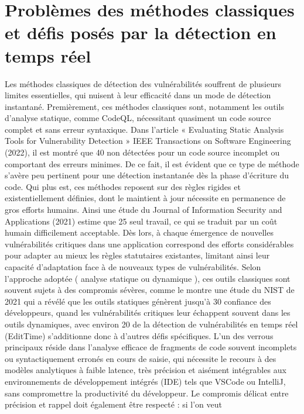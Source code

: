 \chapter{Problèmes des méthodes classiques et défis posés par la détection en temps réel}
    Les méthodes classiques de détection des vulnérabilités souffrent de plusieurs limites
essentielles, qui nuisent à leur efficacité dans un mode de détection instantané.
Premièrement, ces méthodes classiques sont, notamment les outils d’analyse statique,
comme CodeQL, nécessitant quasiment un code source complet et sans erreur syntaxique.
Dans l’article « Evaluating Static Analysis Tools for Vulnerability Detection » IEEE
Transactions on Software Engineering (2022), il est montré que 40%
non détectées pour un code source incomplet ou comportant des erreurs minimes. De ce
fait, il est évident que ce type de méthode s’avère peu pertinent pour une détection
instantanée dès la phase d’écriture du code. Qui plus est, ces méthodes reposent sur des
règles rigides et existentiellement définies, dont le maintient à jour nécessite en permanence
de gros efforts humains. Ainsi une étude du Journal of Information Security and Applications
(2021) estime que 25 %
seul travail, ce qui se traduit par un coût humain difficilement acceptable. Dès lors, à chaque
émergence de nouvelles vulnérabilités critiques dans une application correspond des efforts
considérables pour adapter au mieux les règles statutaires existantes, limitant ainsi leur
capacité d’adaptation face à de nouveaux types de vulnérabilités.
Selon l’approche adoptée ( analyse statique ou dynamique ), ces outils classiques sont
souvent sujets à des compromis sévères, comme le montre une étude du NIST de 2021 qui
a révélé que les outils statiques génèrent jusqu’à 30 %
confiance des développeurs, quand les vulnérabilités critiques leur échappent souvent dans
les outils dynamiques, avec environ 20 %
de la détection de vulnérabilités en temps réel (EditTime) s’additionne donc à d’autres défis
spécifiques. L’un des verrous principaux réside dans l’analyse efficace de fragments de code
souvent incomplets ou syntactiquement erronés en cours de saisie, qui nécessite le recours
à des modèles analytiques à faible latence, très précision et aisément intégrables aux
environnements de développement intégrés (IDE) tels que VSCode ou IntelliJ, sans
compromettre la productivité du développeur.
Le compromis délicat entre précision et rappel doit également être respecté : si l’on veut
